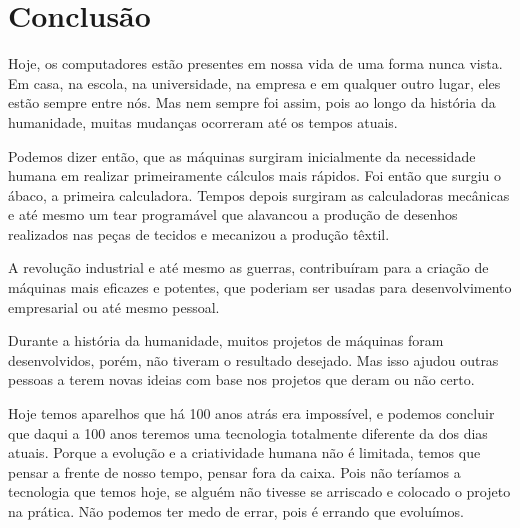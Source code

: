 \documentclass[
	12pt,				%
	openright,			%
	twoside,			%
	a4paper,			%
	english,			%
	french,				%
	spanish,			%
	brazil,				%
	]{abntex2}
\begin{document}


%


\chapter*[Conclusão]{Conclusão}

Hoje, os computadores estão presentes em nossa vida de uma forma nunca vista. Em casa, na escola, na universidade, na empresa e em qualquer outro lugar, eles estão sempre entre nós. Mas nem sempre foi assim, pois ao longo da história da humanidade, muitas mudanças ocorreram até os tempos atuais.
\par
Podemos dizer então, que as máquinas surgiram inicialmente da necessidade humana em realizar primeiramente cálculos mais rápidos. Foi então que surgiu o ábaco, a primeira calculadora. Tempos depois surgiram as calculadoras mecânicas e até mesmo um tear programável que alavancou a produção de desenhos realizados nas peças de tecidos e mecanizou a produção têxtil.
\par
A revolução industrial e até mesmo as guerras, contribuíram para a criação de máquinas mais eficazes e potentes, que poderiam ser usadas para desenvolvimento empresarial ou até mesmo pessoal.
\par
Durante a história da humanidade, muitos projetos de máquinas foram desenvolvidos, porém, não tiveram o resultado desejado. Mas isso ajudou outras pessoas a terem novas ideias com base nos projetos que deram ou não certo.
\par
Hoje temos aparelhos que há 100 anos atrás era impossível, e podemos concluir que daqui a 100 anos teremos uma tecnologia totalmente diferente da dos dias atuais. Porque a evolução e a criatividade humana não é limitada, temos que pensar a frente de nosso tempo, pensar fora da caixa. Pois não teríamos a tecnologia que temos hoje, se alguém não tivesse se arriscado e colocado o projeto na prática. Não podemos ter medo de errar, pois é errando que evoluímos.
\end{document}
